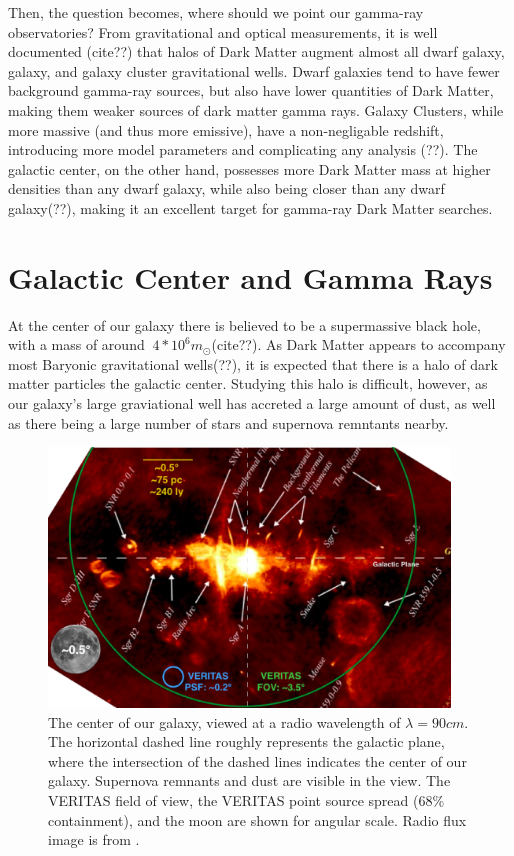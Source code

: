 Then, the question becomes, where should we point our gamma-ray observatories?
From gravitational and optical measurements, it is well documented (cite??) that halos of Dark Matter augment almost all dwarf galaxy, galaxy, and galaxy cluster gravitational wells.
Dwarf galaxies tend to have fewer background gamma-ray sources, but also have lower quantities of Dark Matter, making them weaker sources of dark matter gamma rays.
Galaxy Clusters, while more massive (and thus more emissive), have a non-negligable redshift, introducing more model parameters and complicating any analysis (??).
The galactic center, on the other hand, possesses more Dark Matter mass at higher densities than any dwarf galaxy, while also being closer than any dwarf galaxy(??), making it an excellent target for gamma-ray Dark Matter searches.


\section{Galactic Center and Gamma Rays}

At the center of our galaxy there is believed to be a supermassive black hole, with a mass of around $~4*10^6m_{\odot}$(cite??).
As Dark Matter appears to accompany most Baryonic gravitational wells(??), it is expected that there is a halo of dark matter particles the galactic center.
Studying this halo is difficult, however, as our galaxy's large graviational well has accreted a large amount of dust, as well as there being a large number of stars and supernova remntants nearby.

\begin{figure}[ht]
  \begin{center}
    \includegraphics[width=0.95\textwidth]{images/GalacticCenterInRadio.eps}
    \caption[Galactic Center in Radio]{The center of our galaxy, viewed at a radio wavelength of $\lambda=90cm$.  The horizontal dashed line roughly represents the galactic plane, where the intersection of the dashed lines indicates the center of our galaxy.  Supernova remnants and dust are visible in the view.  The VERITAS field of view, the VERITAS point source spread (68\% containment), and the moon are shown for angular scale.  Radio flux image is from \cite{galactic_center_in_radio}.}
  \end{center}
\end{figure}

